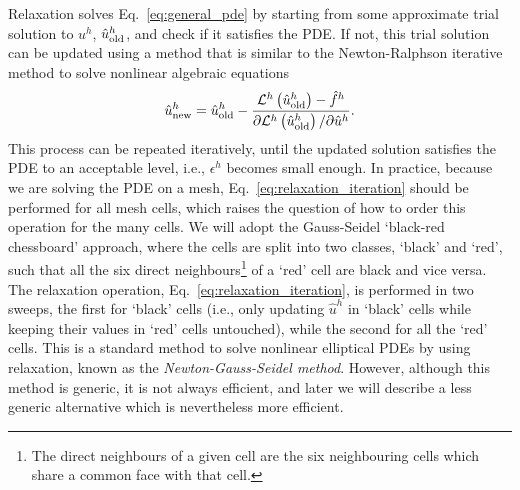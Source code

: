 Relaxation solves Eq.~\eqref{eq:general_pde} by starting from some approximate trial solution to $u^h$, $\hat{u}^h_{\rm old}$, and check if it satisfies the PDE. If not, this trial solution can be updated using a method that is similar to the Newton-Ralphson iterative method to solve nonlinear algebraic equations
\begin{equation}\label{eq:relaxation_iteration}
    \hat{u}^h_{\rm new} = \hat{u}^h_{\rm old} - \frac{\mathcal{L}^h\left(\hat{u}^h_{\rm old}\right)-\hat{f}^h}{\partial\mathcal{L}^h\left(\hat{u}^h_{\rm old}\right)/\partial\hat{u}^h}.
\end{equation}
This process can be repeated iteratively, until the updated solution satisfies the PDE to an acceptable level, i.e., $\epsilon^h$ becomes small enough. In practice, because we are solving the PDE on a mesh, Eq.~\eqref{eq:relaxation_iteration} should be performed for all mesh cells, which raises the question of how to order this operation for the many cells. We will adopt the Gauss-Seidel `black-red chessboard' approach, where the cells are split into two classes, `black' and `red', such that all the six direct neighbours\footnote{The direct neighbours of a given cell are the six neighbouring cells which share a common face with that cell.} of a `red' cell are black and vice versa. The relaxation operation, Eq.~\eqref{eq:relaxation_iteration}, is performed in two sweeps, the first for `black' cells (i.e., only updating $\hat{u}^h$ in `black' cells while keeping their values in `red' cells untouched), while the second for all the `red' cells. This is a standard method to solve nonlinear elliptical PDEs by using relaxation, known as the \textit{Newton-Gauss-Seidel method}. However, although this method is generic, it is not always efficient, and later we will describe a less generic alternative which is nevertheless more efficient. 

